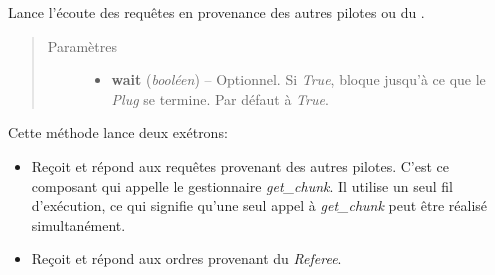 \documentclass[letterpaper,10pt,english]{sphinxmanual}
\begin{document}
\begin{fulllineitems}
\begin{fulllineitems}
\begin{quote}
\begin{description}
\begin{itemize}
\end{itemize}

\end{description}\end{quote}

\end{fulllineitems}


\begin{fulllineitems}
\label{drivers:onitu.api.Plug.listen}
Lance l'écoute des requêtes en provenance des autres pilotes ou du
{\hyperref[components:onitu.referee.Referee]{}}.
\begin{quote}\begin{description}
\item[{Paramètres}] \leavevmode\begin{itemize}
\item {} 
\textbf{wait} (\emph{booléen}) -- Optionnel. Si \emph{True}, bloque jusqu'à ce que le \emph{Plug} se termine. Par défaut à \emph{True}.

\end{itemize}

\end{description}\end{quote}

Cette méthode lance deux exétrons:
\begin{itemize}
\item {} 

\begin{fulllineitems}
\label{drivers:onitu.api.router.Plug.Router}
Reçoit et répond aux requêtes provenant des autres pilotes. C'est ce composant qui appelle le gestionnaire \emph{get\_chunk}. Il utilise un seul fil d'exécution, ce qui signifie qu'une seul appel à \emph{get\_chunk} peut être réalisé simultanément.

\end{fulllineitems}


\item {} 

\begin{fulllineitems}
\label{drivers:onitu.api.dealer.Dealer}
Reçoit et répond aux ordres provenant du \emph{Referee}.


\end{fulllineitems}
\end{itemize}
\end{fulllineitems}
\end{fulllineitems}
\end{document}
